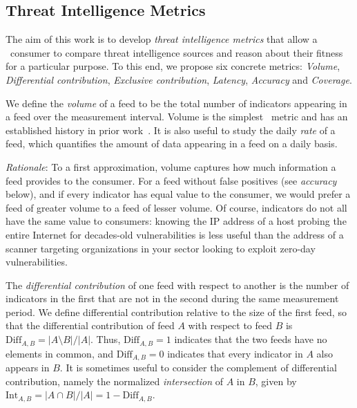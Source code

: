 \subsection{Threat Intelligence Metrics}
\label{sec:metrics}

The aim of this work is to develop \emph{threat intelligence metrics} that
allow a \ti\ consumer to compare threat intelligence sources and reason about
their fitness for a particular purpose. To this end, we propose six concrete
metrics: \emph{Volume}, \emph{Differential contribution}, \emph{Exclusive contribution},
\emph{Latency}, \emph{Accuracy} and \emph{Coverage}.


\metrics {} We define the \emph{volume} of a feed to be the total
number of indicators appearing in a feed over the measurement interval. Volume
is the simplest \ti\ metric and has an established history in prior
work~\cite{jung2004empirical,kuhrer2014paint,
trajectory:oakland11,tasters:imc12,sheng2009empirical,sinha2008shades,thomas2016abuse}.
It is also useful to study the daily \emph{rate} of a feed, which quantifies
the amount of data appearing in a feed on a daily basis.

\emph{Rationale}: To a first approximation, volume captures how much
information a feed provides to the consumer. For a feed without false positives
(see \emph{accuracy} below), and if every indicator has equal value to the
consumer, we would prefer a feed of greater volume to a feed of lesser volume.
Of course, indicators do not all have the same value to consumers: knowing the
IP address of a host probing the entire Internet for decades-old
vulnerabilities is less useful than the address of a scanner targeting
organizations in your sector looking to exploit zero-day vulnerabilities.

\metrics {} The \emph{differential
contribution} of one feed with respect to another is the number of indicators
in the first that are not in the second during the same measurement period. We
define differential contribution relative to the size of the first feed, so
that the differential contribution of feed $A$ with respect to feed $B$ is
$\mathrm{Diff}_{A,B} = |A \setminus B|/|A|$. Thus, $\mathrm{Diff}_{A,B}=1$
indicates that the two feeds have no elements in common, and
$\mathrm{Diff}_{A,B} = 0$ indicates that every indicator in $A$ also appears in
$B$. It is sometimes useful to consider the complement
of differential contribution, namely the normalized \emph{intersection} of $A$ in $B$,
given by $\mathrm{Int}_{A,B} = |A \cap B|/|A| = 1-\mathrm{Diff}_{A,B}$.

